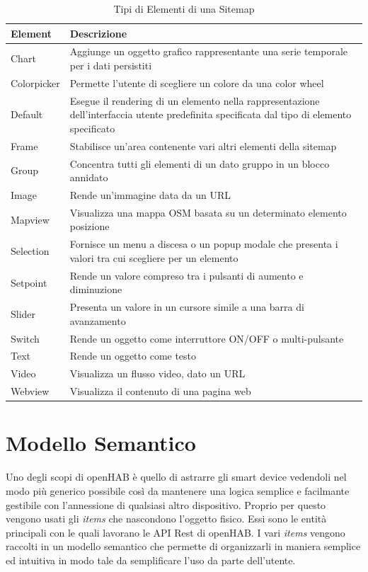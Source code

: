 \begin{table}[]
    \centering
    \begin{tabular}{l|p{10cm}}
        \textbf{Element} & \textbf{Descrizione} \\
        \hline
        Chart & Aggiunge un oggetto grafico rappresentante una serie temporale per i dati persistiti\\
        Colorpicker & Permette l'utente di scegliere un colore da una color wheel\\
        Default & Esegue il rendering di un elemento nella rappresentazione dell'interfaccia utente predefinita specificata dal tipo di elemento specificato\\
        Frame & Stabilisce un'area contenente vari altri elementi della sitemap\\
        Group & Concentra tutti gli elementi di un dato gruppo in un blocco annidato\\
        Image & Rende un'immagine data da un URL\\
        Mapview & Visualizza una mappa OSM basata su un determinato elemento posizione\\
        Selection & Fornisce un menu a discesa o un popup modale che presenta i valori tra cui scegliere per un elemento\\
        Setpoint & Rende un valore compreso tra i pulsanti di aumento e diminuzione\\
        Slider & Presenta un valore in un cursore simile a una barra di avanzamento\\
        Switch & Rende un oggetto come interruttore ON/OFF o multi-pulsante\\
        Text & Rende un oggetto come testo\\
        Video & Visualizza un flusso video, dato un URL\\
        Webview & Visualizza il contenuto di una pagina web
    \end{tabular}
    \caption{Tipi di Elementi di una Sitemap}
    \label{tab:sitemap_element_types}
\end{table}

\section{Modello Semantico}
Uno degli scopi di openHAB è quello di astrarre gli smart device vedendoli nel modo più generico possibile così da mantenere una logica semplice e facilmante gestibile con l'annessione di qualsiasi altro dispositivo. Proprio per questo vengono usati gli {\em items} che nascondono l'oggetto fisico. Essi sono le entità principali con le quali lavorano le API Rest di openHAB. I vari {\em items} vengono raccolti in un modello semantico che permette di organizzarli in maniera semplice ed intuitiva in modo tale da semplificare l'uso da parte dell'utente.

